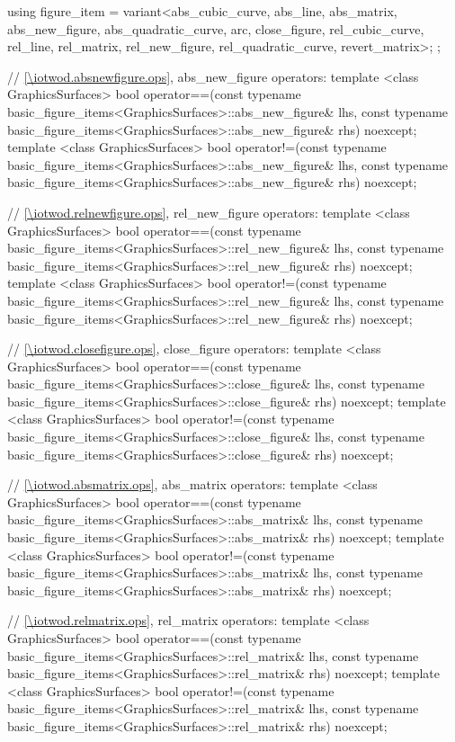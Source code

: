 \begin{codeblock}
{{    using figure_item = variant<abs_cubic_curve, abs_line, abs_matrix, abs_new_figure,
      abs_quadratic_curve, arc, close_figure, rel_cubic_curve, rel_line, rel_matrix,
      rel_new_figure, rel_quadratic_curve, revert_matrix>;
  };

  // \ref{\iotwod.absnewfigure.ops}, abs_new_figure operators:
  template <class GraphicsSurfaces>
  bool operator==(const typename basic_figure_items<GraphicsSurfaces>::abs_new_figure& lhs,
    const typename basic_figure_items<GraphicsSurfaces>::abs_new_figure& rhs) noexcept;
  template <class GraphicsSurfaces>
  bool operator!=(const typename basic_figure_items<GraphicsSurfaces>::abs_new_figure& lhs,
    const typename basic_figure_items<GraphicsSurfaces>::abs_new_figure& rhs) noexcept;
  
  // \ref{\iotwod.relnewfigure.ops}, rel_new_figure operators:
  template <class GraphicsSurfaces>
  bool operator==(const typename basic_figure_items<GraphicsSurfaces>::rel_new_figure& lhs,
    const typename basic_figure_items<GraphicsSurfaces>::rel_new_figure& rhs) noexcept;
  template <class GraphicsSurfaces>
  bool operator!=(const typename basic_figure_items<GraphicsSurfaces>::rel_new_figure& lhs,
    const typename basic_figure_items<GraphicsSurfaces>::rel_new_figure& rhs) noexcept;

  // \ref{\iotwod.closefigure.ops}, close_figure operators:
  template <class GraphicsSurfaces>
  bool operator==(const typename basic_figure_items<GraphicsSurfaces>::close_figure& lhs,
    const typename basic_figure_items<GraphicsSurfaces>::close_figure& rhs) noexcept;
  template <class GraphicsSurfaces>
  bool operator!=(const typename basic_figure_items<GraphicsSurfaces>::close_figure& lhs,
    const typename basic_figure_items<GraphicsSurfaces>::close_figure& rhs) noexcept;

  // \ref{\iotwod.absmatrix.ops}, abs_matrix operators:
  template <class GraphicsSurfaces>
  bool operator==(const typename basic_figure_items<GraphicsSurfaces>::abs_matrix& lhs,
    const typename basic_figure_items<GraphicsSurfaces>::abs_matrix& rhs) noexcept;
  template <class GraphicsSurfaces>
  bool operator!=(const typename basic_figure_items<GraphicsSurfaces>::abs_matrix& lhs,
    const typename basic_figure_items<GraphicsSurfaces>::abs_matrix& rhs) noexcept;

  // \ref{\iotwod.relmatrix.ops}, rel_matrix operators:
  template <class GraphicsSurfaces>
  bool operator==(const typename basic_figure_items<GraphicsSurfaces>::rel_matrix& lhs,
    const typename basic_figure_items<GraphicsSurfaces>::rel_matrix& rhs) noexcept;
  template <class GraphicsSurfaces>
  bool operator!=(const typename basic_figure_items<GraphicsSurfaces>::rel_matrix& lhs,
    const typename basic_figure_items<GraphicsSurfaces>::rel_matrix& rhs) noexcept;

}
\end{codeblock}
